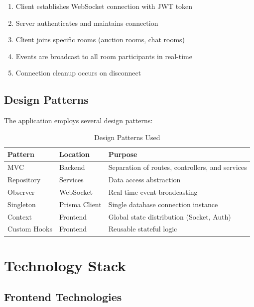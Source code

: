 \documentclass[12pt,a4paper]{report}
\begin{document}
\begin{enumerate}
    \item Client establishes WebSocket connection with JWT token
    \item Server authenticates and maintains connection
    \item Client joins specific rooms (auction rooms, chat rooms)
    \item Events are broadcast to all room participants in real-time
    \item Connection cleanup occurs on disconnect
\end{enumerate}

\section{Design Patterns}

The application employs several design patterns:

\begin{table}[H]
\centering
\begin{tabularx}{\textwidth}{|l|l|X|}
\hline
\textbf{Pattern} & \textbf{Location} & \textbf{Purpose} \\
\hline
MVC & Backend & Separation of routes, controllers, and services \\
\hline
Repository & Services & Data access abstraction \\
\hline
Observer & WebSocket & Real-time event broadcasting \\
\hline
Singleton & Prisma Client & Single database connection instance \\
\hline
Context & Frontend & Global state distribution (Socket, Auth) \\
\hline
Custom Hooks & Frontend & Reusable stateful logic \\
\hline
\end{tabularx}
\caption{Design Patterns Used}
\end{table}

\chapter{Technology Stack}

\section{Frontend Technologies}
\end{document}
